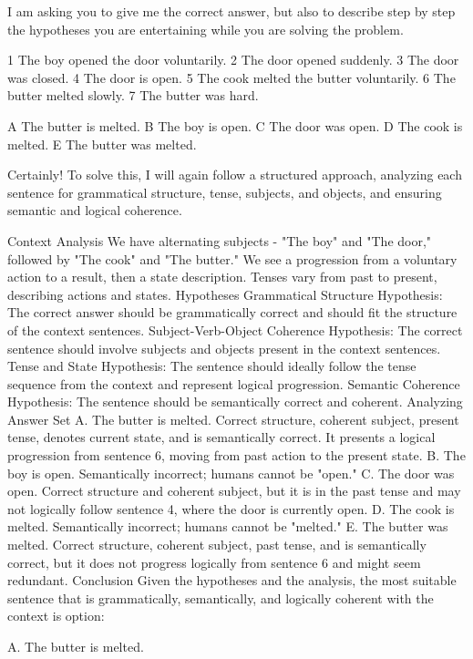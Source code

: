 I am asking you to give me the correct answer, but also to describe step by step  the hypotheses you are entertaining while you are solving the problem. 


1  The boy opened the door voluntarily.
2  The door opened suddenly.
3  The door was closed.
4  The door is open.
5  The cook melted the butter voluntarily.
6  The butter melted slowly.
7  The butter was hard.

A  The butter is melted.
B  The boy is open.
C  The door was open.
D  The cook is melted.
E  The butter was melted.

Certainly! To solve this, I will again follow a structured approach, analyzing each sentence for grammatical structure, tense, subjects, and objects, and ensuring semantic and logical coherence.

Context Analysis
We have alternating subjects - "The boy" and "The door," followed by "The cook" and "The butter."
We see a progression from a voluntary action to a result, then a state description.
Tenses vary from past to present, describing actions and states.
Hypotheses
Grammatical Structure Hypothesis: The correct answer should be grammatically correct and should fit the structure of the context sentences.
Subject-Verb-Object Coherence Hypothesis: The correct sentence should involve subjects and objects present in the context sentences.
Tense and State Hypothesis: The sentence should ideally follow the tense sequence from the context and represent logical progression.
Semantic Coherence Hypothesis: The sentence should be semantically correct and coherent.
Analyzing Answer Set
A. The butter is melted.
Correct structure, coherent subject, present tense, denotes current state, and is semantically correct.
It presents a logical progression from sentence 6, moving from past action to the present state.
B. The boy is open.
Semantically incorrect; humans cannot be "open."
C. The door was open.
Correct structure and coherent subject, but it is in the past tense and may not logically follow sentence 4, where the door is currently open.
D. The cook is melted.
Semantically incorrect; humans cannot be "melted."
E. The butter was melted.
Correct structure, coherent subject, past tense, and is semantically correct, but it does not progress logically from sentence 6 and might seem redundant.
Conclusion
Given the hypotheses and the analysis, the most suitable sentence that is grammatically, semantically, and logically coherent with the context is option:

A. The butter is melted.

